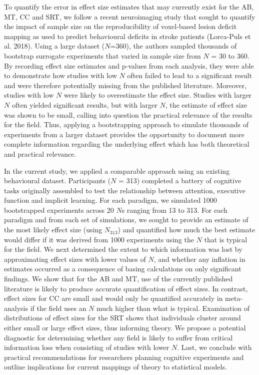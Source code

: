 \documentclass{article}
\begin{document}
To quantify the error in effect size estimates that may currently exist for the AB, MT, CC and SRT, we follow a recent neuroimaging study that sought to quantify the impact of sample size on the reproducibility of voxel-based lesion deficit mapping as used to predict behavioural deficits in stroke patients (Lorca-Puls et al. 2018). Using a large dataset (\(N\)=360), the authors sampled thousands of bootstrap surrogate experiments that varied in sample size from \(N\) = 30 to 360. By recording effect size estimates and p-values from each analysis, they were able to demonstrate how studies with low \(N\) often failed to lead to a significant result and were therefore potentially missing from the published literature. Moreover, studies with low \(N\) were likely to overestimate the effect size. Studies with larger \(N\) often yielded significant results, but with larger \(N\), the estimate of effect size was shown to be small, calling into question the practical relevance of the results for the field. Thus, applying a bootstrapping approach to simulate thousands of experiments from a larger dataset provides the opportunity to document more complete information regarding the underlying effect which has both theoretical and practical relevance.

In the current study, we applied a comparable approach using an existing behavioural dataset. Participants (\(N\) = 313) completed a battery of cognitive tasks originally assembled to test the relationship between attention, executive function and implicit learning. For each paradigm, we simulated 1000 bootstrapped experiments across 20 \(N\)s ranging from 13 to 313. For each paradigm and from each set of simulations, we sought to provide an estimate of the most likely effect size (using \(N_{313}\)) and quantified how much the best estimate would differ if it was derived from 1000 experiments using the \(N\) that is typical for the field. We next determined the extent to which information was lost by approximating effect sizes with lower values of \(N\), and whether any inflation in estimates occurred as a consequence of basing calculations on only significant findings. We show that for the AB and MT, use of the currently published literature is likely to produce accurate quantification of effect sizes. In contrast, effect sizes for CC are small and would only be quantified accurately in meta-analysis if the field uses an \(N\) much higher than what is typical. Examination of distributions of effect sizes for the SRT shows that individuals cluster around either small or large effect sizes, thus informing theory. We propose a potential diagnostic for determining whether any field is likely to suffer from critical information loss when consisting of studies with lower \(N\). Last, we conclude with practical recommendations for researchers planning cognitive experiments and outline implications for current mappings of theory to statistical models.
\end{document}
